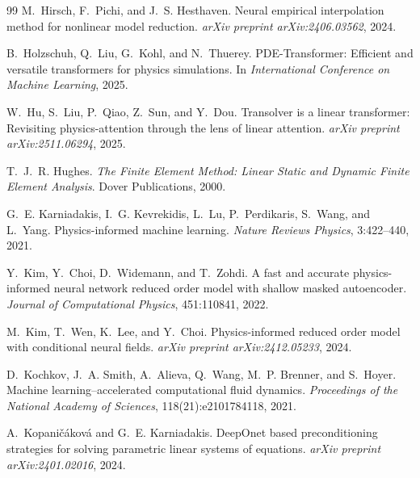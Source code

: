 \begin{thebibliography}{99}
M.~Hirsch, F.~Pichi, and J.~S. Hesthaven.
\newblock Neural empirical interpolation method for nonlinear model
reduction.
\newblock \emph{arXiv preprint arXiv:2406.03562}, 2024.

B.~Holzschuh, Q.~Liu, G.~Kohl, and N.~Thuerey.
\newblock PDE-Transformer: Efficient and versatile transformers for
physics simulations.
\newblock In \emph{International Conference on Machine Learning}, 2025.

W.~Hu, S.~Liu, P.~Qiao, Z.~Sun, and Y.~Dou.
\newblock Transolver is a linear transformer: Revisiting
physics-attention through the lens of linear attention.
\newblock \emph{arXiv preprint arXiv:2511.06294}, 2025.

T.~J.~R. Hughes.
\newblock \emph{The Finite Element Method: Linear Static and Dynamic
Finite Element Analysis}.
\newblock Dover Publications, 2000.

G.~E. Karniadakis, I.~G. Kevrekidis, L.~Lu, P.~Perdikaris, S.~Wang, and
L.~Yang.
\newblock Physics-informed machine learning.
\newblock \emph{Nature Reviews Physics}, 3:422--440, 2021.

Y.~Kim, Y.~Choi, D.~Widemann, and T.~Zohdi.
\newblock A fast and accurate physics-informed neural network reduced
order model with shallow masked autoencoder.
\newblock \emph{Journal of Computational Physics}, 451:110841, 2022.

M.~Kim, T.~Wen, K.~Lee, and Y.~Choi.
\newblock Physics-informed reduced order model with conditional neural
fields.
\newblock \emph{arXiv preprint arXiv:2412.05233}, 2024.

D.~Kochkov, J.~A. Smith, A.~Alieva, Q.~Wang, M.~P. Brenner, and
S.~Hoyer.
\newblock Machine learning--accelerated computational fluid dynamics.
\newblock \emph{Proceedings of the National Academy of Sciences},
118(21):e2101784118, 2021.

A.~Kopani\v{c}\'akov\'a and G.~E. Karniadakis.
\newblock DeepOnet based preconditioning strategies for solving
parametric linear systems of equations.
\newblock \emph{arXiv preprint arXiv:2401.02016}, 2024.


\end{thebibliography}
